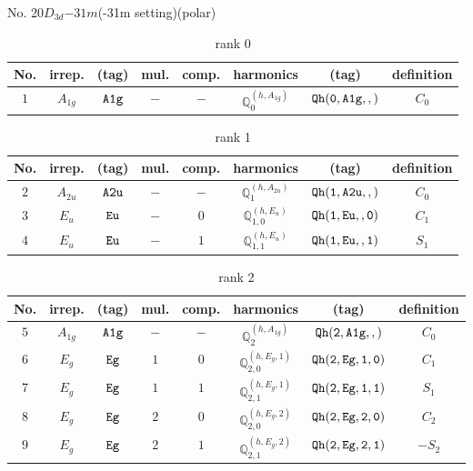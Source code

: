 \documentclass[fleqn,8pt]{jsarticle}
\begin{document}
\setcounter{MaxMatrixCols}{16}

\begin{center}
\LARGE
No. 20\quad$D_{3d}$\quad$-31m$\quad(-31m setting)\quad[ trigonal ] (polar)
\end{center}
\begin{table}[ht!]
\begin{center}
\caption{rank 0}
\renewcommand{\arraystretch}{1.3}
\begin{tabular}{cccccccc} \hline \hline
No. & irrep. & (tag) & mul. & comp. & harmonics & (tag) & definition \\ \hline
$ 1 $ & $ A_{1g} $ & $ {\tt A1g} $ & $ - $ & $ - $ & $ \mathbb{Q}_{0}^{(h,A_{1g})} $ & $ {\tt Qh(0,A1g,,)} $ & $ C_{0} $ \\
 \hline \hline
\end{tabular}
\end{center}
\end{table}
\begin{table}[ht!]
\begin{center}
\caption{rank 1}
\renewcommand{\arraystretch}{1.3}
\begin{tabular}{cccccccc} \hline \hline
No. & irrep. & (tag) & mul. & comp. & harmonics & (tag) & definition \\ \hline
$ 2 $ & $ A_{2u} $ & $ {\tt A2u} $ & $ - $ & $ - $ & $ \mathbb{Q}_{1}^{(h,A_{2u})} $ & $ {\tt Qh(1,A2u,,)} $ & $ C_{0} $ \\
$ 3 $ & $ E_{u} $ & $ {\tt Eu} $ & $ - $ & $ 0 $ & $ \mathbb{Q}_{1,0}^{(h,E_{u})} $ & $ {\tt Qh(1,Eu,,0)} $ & $ C_{1} $ \\
$ 4 $ & $ E_{u} $ & $ {\tt Eu} $ & $ - $ & $ 1 $ & $ \mathbb{Q}_{1,1}^{(h,E_{u})} $ & $ {\tt Qh(1,Eu,,1)} $ & $ S_{1} $ \\
 \hline \hline
\end{tabular}
\end{center}
\end{table}
\begin{table}[ht!]
\begin{center}
\caption{rank 2}
\renewcommand{\arraystretch}{1.3}
\begin{tabular}{cccccccc} \hline \hline
No. & irrep. & (tag) & mul. & comp. & harmonics & (tag) & definition \\ \hline
$ 5 $ & $ A_{1g} $ & $ {\tt A1g} $ & $ - $ & $ - $ & $ \mathbb{Q}_{2}^{(h,A_{1g})} $ & $ {\tt Qh(2,A1g,,)} $ & $ C_{0} $ \\
$ 6 $ & $ E_{g} $ & $ {\tt Eg} $ & $ 1 $ & $ 0 $ & $ \mathbb{Q}_{2,0}^{(h,E_{g},1)} $ & $ {\tt Qh(2,Eg,1,0)} $ & $ C_{1} $ \\
$ 7 $ & $ E_{g} $ & $ {\tt Eg} $ & $ 1 $ & $ 1 $ & $ \mathbb{Q}_{2,1}^{(h,E_{g},1)} $ & $ {\tt Qh(2,Eg,1,1)} $ & $ S_{1} $ \\
$ 8 $ & $ E_{g} $ & $ {\tt Eg} $ & $ 2 $ & $ 0 $ & $ \mathbb{Q}_{2,0}^{(h,E_{g},2)} $ & $ {\tt Qh(2,Eg,2,0)} $ & $ C_{2} $ \\
$ 9 $ & $ E_{g} $ & $ {\tt Eg} $ & $ 2 $ & $ 1 $ & $ \mathbb{Q}_{2,1}^{(h,E_{g},2)} $ & $ {\tt Qh(2,Eg,2,1)} $ & $ - S_{2} $ \\
 \hline \hline
\end{tabular}
\end{center}
\end{table}
\end{document}
